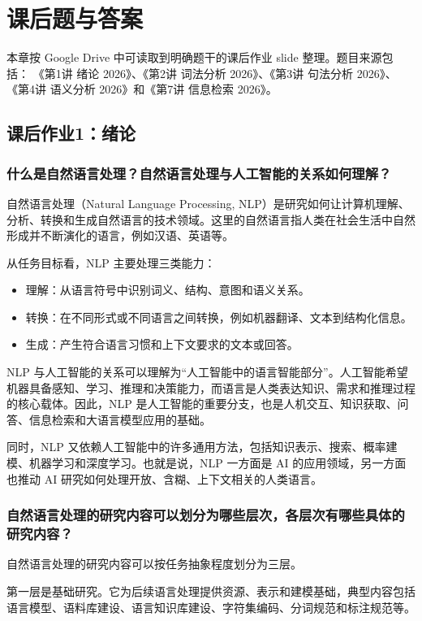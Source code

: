 \chapter{课后题与答案}

本章按 Google Drive 中可读取到明确题干的课后作业 slide 整理。题目来源包括：
《第1讲 绪论 2026》、《第2讲 词法分析 2026》、《第3讲 句法分析 2026》、
《第4讲 语义分析 2026》和《第7讲 信息检索 2026》。

\section{课后作业1：绪论}

\subsection{什么是自然语言处理？自然语言处理与人工智能的关系如何理解？}

自然语言处理（Natural Language Processing, NLP）是研究如何让计算机理解、分析、转换和生成自然语言的技术领域。这里的自然语言指人类在社会生活中自然形成并不断演化的语言，例如汉语、英语等。

从任务目标看，NLP 主要处理三类能力：
\begin{itemize}
  \item 理解：从语言符号中识别词义、结构、意图和语义关系。
  \item 转换：在不同形式或不同语言之间转换，例如机器翻译、文本到结构化信息。
  \item 生成：产生符合语言习惯和上下文要求的文本或回答。
\end{itemize}

NLP 与人工智能的关系可以理解为“人工智能中的语言智能部分”。人工智能希望机器具备感知、学习、推理和决策能力，而语言是人类表达知识、需求和推理过程的核心载体。因此，NLP 是人工智能的重要分支，也是人机交互、知识获取、问答、信息检索和大语言模型应用的基础。

同时，NLP 又依赖人工智能中的许多通用方法，包括知识表示、搜索、概率建模、机器学习和深度学习。也就是说，NLP 一方面是 AI 的应用领域，另一方面也推动 AI 研究如何处理开放、含糊、上下文相关的人类语言。

\subsection{自然语言处理的研究内容可以划分为哪些层次，各层次有哪些具体的研究内容？}

自然语言处理的研究内容可以按任务抽象程度划分为三层。

第一层是基础研究。它为后续语言处理提供资源、表示和建模基础，典型内容包括语言模型、语料库建设、语言知识库建设、字符集编码、分词规范和标注规范等。

